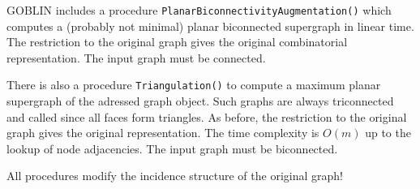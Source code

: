\documentclass[a4paper,11pt,twoside]{book}
\begin{document}
\begin{multicols}{2}
GOBLIN includes a procedure \verb/PlanarBiconnectivityAugmentation()/ which
computes a (probably not minimal) planar biconnected supergraph in linear time.
The restriction to the original graph gives the original combinatorial
representation. The input graph must be connected.

There is also a procedure \verb/Triangulation()/ to compute a maximum planar
supergraph of the adressed graph object. Such graphs are always triconnected
and called  since all faces form triangles. 
As before, the restriction to the original graph gives the original representation.
The time complexity is $O(m)$ up to the lookup of node adjacencies. The input
graph must be biconnected.

All procedures modify the incidence structure of the original graph!



\end{multicols}
\end{document}
